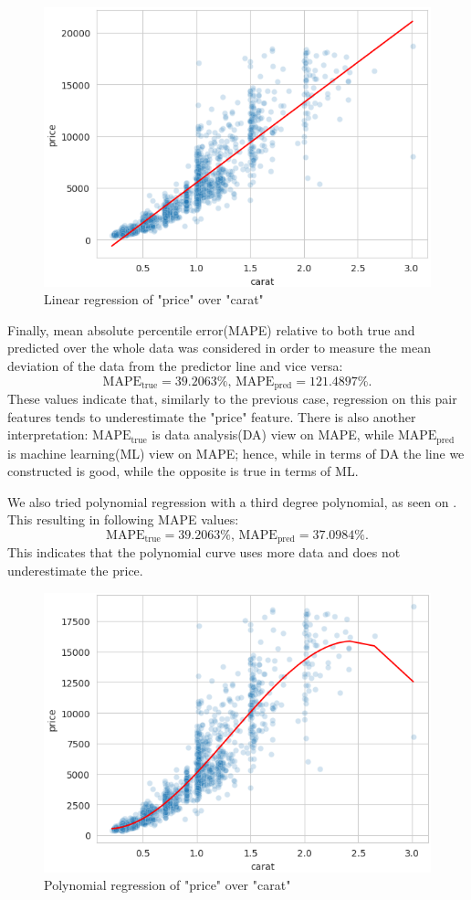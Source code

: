 \documentclass[14pt,a4paper]{extarticle}
\begin{document}
	\begin{figure}[hbtp]
		\centering
		\includegraphics[width=.8\textwidth]{media/caratVpriceReg.png}
		\caption{Linear regression of "price" over "carat"}
		\label{fig:caratVpriceReg}
	\end{figure}
	
	Finally, mean absolute percentile error(MAPE) relative to both true and predicted over the whole data was considered in order to measure the mean deviation of the data from the predictor line and vice versa:
	\[\text{MAPE}_{\text{true}}= 39.2063\%,\, \text{MAPE}_{\text{pred}}=121.4897\%.\]
	These values indicate that, similarly to the previous case, regression on this pair features tends to underestimate the "price" feature. There is also another interpretation: $\text{MAPE}_{\text{true}}$ is data analysis(DA) view on MAPE, while $\text{MAPE}_{\text{pred}}$ is machine learning(ML) view on MAPE; hence, while in terms of DA the line we constructed is good, while the opposite is true in terms of ML.
	
	We also tried polynomial regression with a third degree polynomial, as seen on . This resulting in following MAPE values:
	\[\text{MAPE}_{\text{true}}= 39.2063\%,\, \text{MAPE}_{\text{pred}}=37.0984\%.\]
	This indicates that the polynomial curve uses more data and does not underestimate the price.
	
	\begin{figure}[hbtp]
		\centering
		\includegraphics[width=.8\textwidth]{media/caratVpriceRegAlt.png}
		\caption{Polynomial regression of "price" over "carat"}
		\label{fig:caratVpriceRegAlt}
	\end{figure}
	
\end{document}
